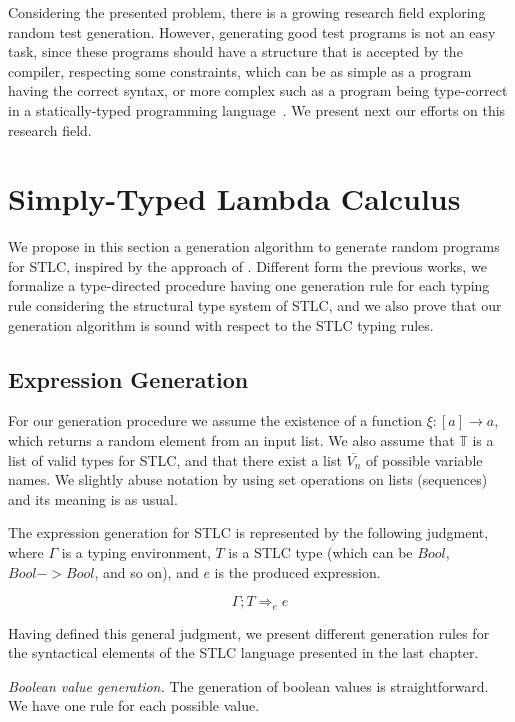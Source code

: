 \documentclass[tese,capa,english]{texufpel}
\begin{document}
Considering the presented problem, there is a growing research field exploring random test generation. However, generating good test programs is not an easy task, since these programs should have a structure that is accepted by the compiler, respecting some constraints, which can be as simple as a program having the correct syntax, or more complex such as a program being type-correct in a statically-typed programming language~\cite{Palka:2011:TOC:1982595.1982615}. We present next our efforts on this research field.

\section{Simply-Typed Lambda Calculus}

We propose in this section a generation algorithm to generate random programs for STLC, inspired by the approach of \citet{Palka:2011:TOC:1982595.1982615}. Different form the previous works, we formalize a type-directed procedure having one generation rule for each typing rule considering the structural type system of STLC, and we also prove that our generation algorithm is sound with respect to the STLC typing rules.

\subsection{Expression Generation}

For our generation procedure we assume the existence of a function $\xi : [a] \rightarrow a$, which returns a random element from an input list. We also assume that $\mathbb{T}$ is a list of valid types for STLC, and that there exist a list $\overline{V_n}$ of possible variable names. We slightly abuse notation by using set operations on lists (sequences) and its meaning is as usual.

The expression generation for STLC is represented by the following judgment, where $\Gamma$ is a typing environment, $T$ is a STLC type (which can be $Bool$, $Bool -> Bool$, and so on), and $e$ is the produced expression.

\[
  \Gamma ; T \Rightarrow_e e
\]

Having defined this general judgment, we present different generation rules for the syntactical elements of the STLC language presented in the last chapter.

\vspace{5pt}
\noindent\emph{Boolean value generation.} The generation of boolean values is straightforward. We have one rule for each possible value.
\end{document}
